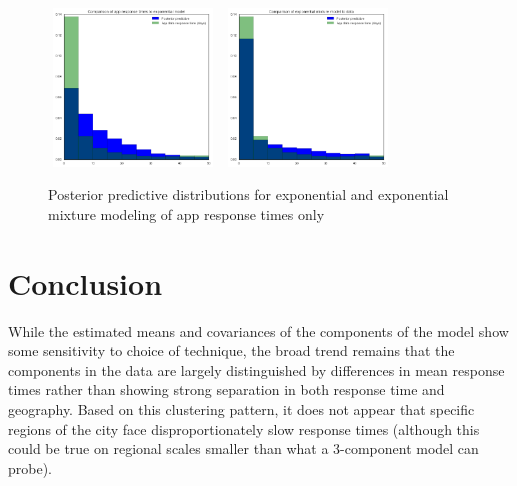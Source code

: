 \documentclass[twoside]{article}
\theoremstyle{theorem}
\theoremstyle{theorem}
\theoremstyle{theorem}
\theoremstyle{lemma}
\theoremstyle{definition}
\theoremstyle{example}
\begin{document}
\begin{figure}[h!]
\begin{center}
\includegraphics[width=45mm, height=42mm]{expomodel}
\includegraphics[width=45mm, height=42mm]{mixture}
\caption{Posterior predictive distributions for exponential and exponential mixture modeling of app response times only}
\label{expo}
\end{center}
\end{figure}


\section{Conclusion}
While the estimated means and covariances of the components of the model show some sensitivity to choice of technique, the broad trend remains that the components in the data are largely distinguished by differences in mean response times rather than showing strong separation in both response time and geography. Based on this clustering pattern, it does not appear that specific regions of the city face disproportionately slow response times (although this could be true on regional scales smaller than what a 3-component model can probe). 
\end{document}
